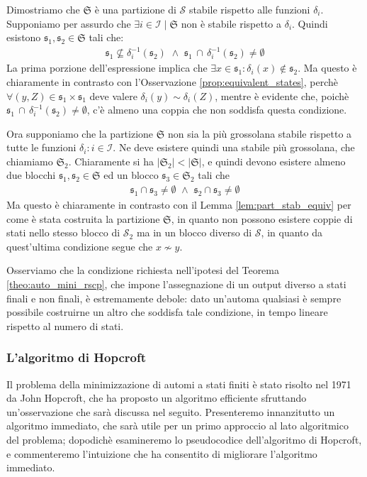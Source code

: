 \begin{proof2}
    Dimostriamo che $\mathfrak{S}$ è una partizione di $\mathcal{S}$ stabile rispetto alle funzioni $\delta_i$. Supponiamo per assurdo che $\exists i \in \mathcal{I} \mid \mathfrak{S}$ non è stabile rispetto a $\delta_i$. Quindi esistono $\mathfrak{s}_1, \mathfrak{s}_2 \in \mathfrak{S}$ tali che:
    \begin{gather*}
        \mathfrak{s}_1 \not\subseteq \delta_i^{-1}(\mathfrak{s}_2) \,\, \land \,\, \mathfrak{s}_1 \,\cap \,\delta_i^{-1}(\mathfrak{s}_2) \neq \emptyset
    \end{gather*}
    La prima porzione dell'espressione implica che $\exists x \in \mathfrak{s}_1 : \delta_i(x) \not\in \mathfrak{s}_2$. Ma questo è chiaramente in contrasto con l'Osservazione \ref{prop:equivalent_states}, perchè $\forall (y,Z) \in \mathfrak{s}_1 \times \mathfrak{s}_1$ deve valere $\delta_i(y) \sim \delta_i(Z)$, mentre è evidente che, poichè $\mathfrak{s}_1 \,\cap\, \delta_i^{-1}(\mathfrak{s}_2) \neq \emptyset$, c'è almeno una coppia che non soddisfa questa condizione.

    Ora supponiamo che la partizione $\mathfrak{S}$ non sia la più grossolana stabile rispetto a tutte le funzioni $\delta_i : i \in \mathcal{I}$. Ne deve esistere quindi una stabile più grossolana, che chiamiamo $\mathfrak{S}_2$. Chiaramente si ha $|\mathfrak{S}_2| < |\mathfrak{S}|$, e quindi devono esistere almeno due blocchi $\mathfrak{s}_1, \mathfrak{s}_2 \in \mathfrak{S}$ ed un blocco $\mathfrak{s}_3 \in \mathfrak{S}_2$ tali che
    \begin{gather*}
        \mathfrak{s}_1 \cap \mathfrak{s}_3 \neq \emptyset \,\,\land\,\, \mathfrak{s}_2 \cap \mathfrak{s}_3 \neq \emptyset
    \end{gather*}
    Ma questo è chiaramente in contrasto con il Lemma \ref{lem:part_stab_equiv} per come è stata costruita la partizione $\mathfrak{S}$, in quanto non possono esistere coppie di stati nello stesso blocco di $\mathcal{S}_2$ ma in un blocco diverso di $\mathcal{S}$, in quanto da quest'ultima condizione segue che $x \not\sim y$.
\end{proof2}
Osserviamo che la condizione richiesta nell'ipotesi del Teorema \ref{theo:auto_mini_rscp}, che impone l'assegnazione di un output diverso a stati finali e non finali, è estremamente debole: dato un'automa qualsiasi è sempre possibile costruirne un altro che soddisfa tale condizione, in tempo lineare rispetto al numero di stati.

\subsubsection{L'algoritmo di Hopcroft}
Il problema della minimizzazione di automi a stati finiti è stato risolto nel 1971 da John Hopcroft, che ha proposto un algoritmo efficiente sfruttando un'osservazione che sarà discussa nel seguito. Presenteremo innanzitutto un algoritmo immediato, che sarà utile per un primo approccio al lato algoritmico del problema; dopodichè esamineremo lo pseudocodice dell'algoritmo di Hopcroft, e commenteremo l'intuizione che ha consentito di migliorare l'algoritmo immediato.

